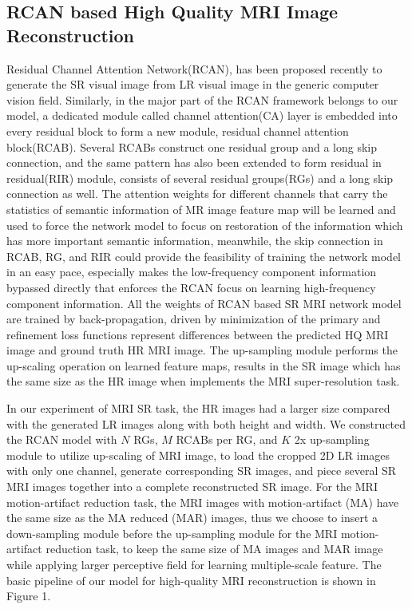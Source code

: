 \documentclass[runningheads]{llncs}
\begin{document}
\subsection{RCAN based High Quality MRI Image Reconstruction}
Residual Channel Attention Network(RCAN), has been proposed recently\cite{ref_rcan} to generate the SR visual image from LR visual image in the generic computer vision field. Similarly, in the major part of the RCAN framework belongs to our model, a dedicated module called channel attention(CA) layer is embedded into every residual block\cite{ref_resnet} to form a new module, residual channel attention block(RCAB). Several RCABs construct one residual group and a long skip connection, and the same pattern has also been extended to form residual in residual(RIR) module, consists of several residual groups(RGs) and a long skip connection as well. The attention weights for different channels that carry the statistics of semantic information of MR image feature map will be learned and used to force the network model to focus on restoration of the information which has more important semantic information, meanwhile, the skip connection in RCAB, RG, and RIR could provide the feasibility of training the network model in an easy pace, especially makes the low-frequency component information bypassed directly that enforces the RCAN focus on learning high-frequency component information. All the weights of RCAN based SR MRI network model are trained by back-propagation, driven by minimization of the primary and refinement loss functions represent differences between the predicted HQ MRI image and ground truth HR MRI image. The up-sampling module performs the up-scaling operation on learned feature maps, results in the SR image which has the same size as the HR image when implements the MRI super-resolution task.

In our experiment of MRI SR task, the HR images had a larger size compared with the generated LR images along with both height and width. We constructed the RCAN model with $N$ RGs, $M$ RCABs per RG, and $K$ 2x up-sampling module to utilize up-scaling of MRI image, to load the cropped 2D LR images with only one channel, generate corresponding SR images, and piece several SR MRI images together into a complete reconstructed SR image. For the MRI motion-artifact reduction task, the MRI images with motion-artifact (MA) have the same size as the MA reduced (MAR) images, thus we choose to insert a down-sampling module before the up-sampling module for the MRI motion-artifact reduction task, to keep the same size of MA images and MAR image while applying larger perceptive field for learning multiple-scale feature. The basic pipeline of our model for high-quality MRI reconstruction is shown in Figure 1.
\end{document}
